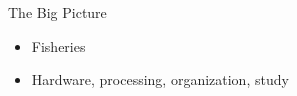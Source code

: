 




\begin{frame}{The Big Picture}
    \begin{itemize}
        \item Fisheries
        \item Hardware, processing, organization, study
    \end{itemize}    
\end{frame}

